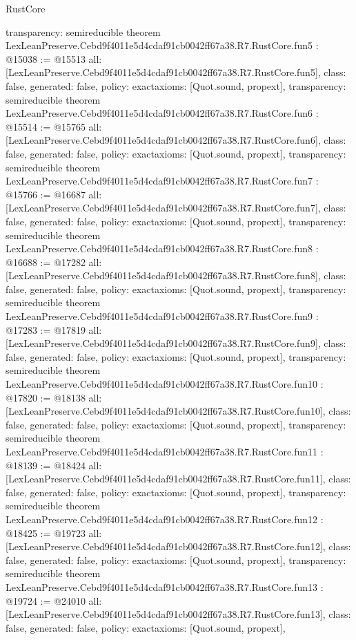 \begin{lexlean}{RustCore}
\begin{coremodule}
{  transparency: semireducible
}
theorem LexLeanPreserve.Cebd9f4011e5d4cdaf91cb0042ff67a38.R7.RustCore.fun5 : @15038 := @15513 {
  all: [LexLeanPreserve.Cebd9f4011e5d4cdaf91cb0042ff67a38.R7.RustCore.fun5],
  class: false,
  generated: false,
  policy: exact{axioms: [Quot.sound, propext]},
  transparency: semireducible
}
theorem LexLeanPreserve.Cebd9f4011e5d4cdaf91cb0042ff67a38.R7.RustCore.fun6 : @15514 := @15765 {
  all: [LexLeanPreserve.Cebd9f4011e5d4cdaf91cb0042ff67a38.R7.RustCore.fun6],
  class: false,
  generated: false,
  policy: exact{axioms: [Quot.sound, propext]},
  transparency: semireducible
}
theorem LexLeanPreserve.Cebd9f4011e5d4cdaf91cb0042ff67a38.R7.RustCore.fun7 : @15766 := @16687 {
  all: [LexLeanPreserve.Cebd9f4011e5d4cdaf91cb0042ff67a38.R7.RustCore.fun7],
  class: false,
  generated: false,
  policy: exact{axioms: [Quot.sound, propext]},
  transparency: semireducible
}
theorem LexLeanPreserve.Cebd9f4011e5d4cdaf91cb0042ff67a38.R7.RustCore.fun8 : @16688 := @17282 {
  all: [LexLeanPreserve.Cebd9f4011e5d4cdaf91cb0042ff67a38.R7.RustCore.fun8],
  class: false,
  generated: false,
  policy: exact{axioms: [Quot.sound, propext]},
  transparency: semireducible
}
theorem LexLeanPreserve.Cebd9f4011e5d4cdaf91cb0042ff67a38.R7.RustCore.fun9 : @17283 := @17819 {
  all: [LexLeanPreserve.Cebd9f4011e5d4cdaf91cb0042ff67a38.R7.RustCore.fun9],
  class: false,
  generated: false,
  policy: exact{axioms: [Quot.sound, propext]},
  transparency: semireducible
}
theorem LexLeanPreserve.Cebd9f4011e5d4cdaf91cb0042ff67a38.R7.RustCore.fun10 : @17820 := @18138 {
  all: [LexLeanPreserve.Cebd9f4011e5d4cdaf91cb0042ff67a38.R7.RustCore.fun10],
  class: false,
  generated: false,
  policy: exact{axioms: [Quot.sound, propext]},
  transparency: semireducible
}
theorem LexLeanPreserve.Cebd9f4011e5d4cdaf91cb0042ff67a38.R7.RustCore.fun11 : @18139 := @18424 {
  all: [LexLeanPreserve.Cebd9f4011e5d4cdaf91cb0042ff67a38.R7.RustCore.fun11],
  class: false,
  generated: false,
  policy: exact{axioms: [Quot.sound, propext]},
  transparency: semireducible
}
theorem LexLeanPreserve.Cebd9f4011e5d4cdaf91cb0042ff67a38.R7.RustCore.fun12 : @18425 := @19723 {
  all: [LexLeanPreserve.Cebd9f4011e5d4cdaf91cb0042ff67a38.R7.RustCore.fun12],
  class: false,
  generated: false,
  policy: exact{axioms: [Quot.sound, propext]},
  transparency: semireducible
}
theorem LexLeanPreserve.Cebd9f4011e5d4cdaf91cb0042ff67a38.R7.RustCore.fun13 : @19724 := @24010 {
  all: [LexLeanPreserve.Cebd9f4011e5d4cdaf91cb0042ff67a38.R7.RustCore.fun13],
  class: false,
  generated: false,
  policy: exact{axioms: [Quot.sound, propext]},
}
\end{coremodule}
\end{lexlean}

